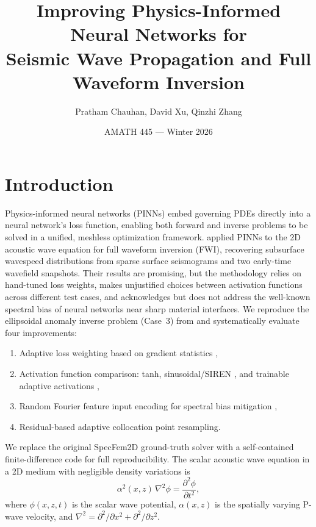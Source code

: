 \documentclass[11pt, letterpaper]{article}
\title{Improving Physics-Informed Neural Networks for\\
Seismic Wave Propagation and Full Waveform Inversion}
\author{Pratham Chauhan, David Xu, Qinzhi Zhang}
\date{AMATH 445 --- Winter 2026}
\begin{document}
\maketitle

\section{Introduction}
\label{sec:intro}

Physics-informed neural networks (PINNs) \citep{raissi2019physics} embed governing PDEs directly into a neural network's loss function, enabling both forward and inverse problems to be solved in a unified, meshless optimization framework.
\citet{rashtbehesht2022} applied PINNs to the 2D acoustic wave equation for full waveform inversion (FWI), recovering subsurface wavespeed distributions from sparse surface seismograms and two early-time wavefield snapshots.
Their results are promising, but the methodology relies on hand-tuned loss weights, makes unjustified choices between activation functions across different test cases, and acknowledges but does not address the well-known spectral bias of neural networks near sharp material interfaces.
We reproduce the ellipsoidal anomaly inverse problem (Case~3) from \citet{rashtbehesht2022} and systematically evaluate four improvements:
\begin{enumerate}[nosep]
  \item Adaptive loss weighting based on gradient statistics \citep{wang2021understanding},
  \item Activation function comparison: tanh, sinusoidal/SIREN \citep{sitzmann2020implicit}, and trainable adaptive activations \citep{jagtap2020adaptive},
  \item Random Fourier feature input encoding for spectral bias mitigation \citep{tancik2020fourier},
  \item Residual-based adaptive collocation point resampling.
\end{enumerate}
We replace the original SpecFem2D ground-truth solver with a self-contained finite-difference code for full reproducibility.
The scalar acoustic wave equation in a 2D medium with negligible density variations is
\begin{equation}
  \alpha^2(x,z)\,\nabla^2 \phi = \frac{\partial^2 \phi}{\partial t^2},
  \label{eq:wave}
\end{equation}
where $\phi(x,z,t)$ is the scalar wave potential, $\alpha(x,z)$ is the spatially varying P-wave velocity, and $\nabla^2 = \partial^2/\partial x^2 + \partial^2/\partial z^2$.
\end{document}

